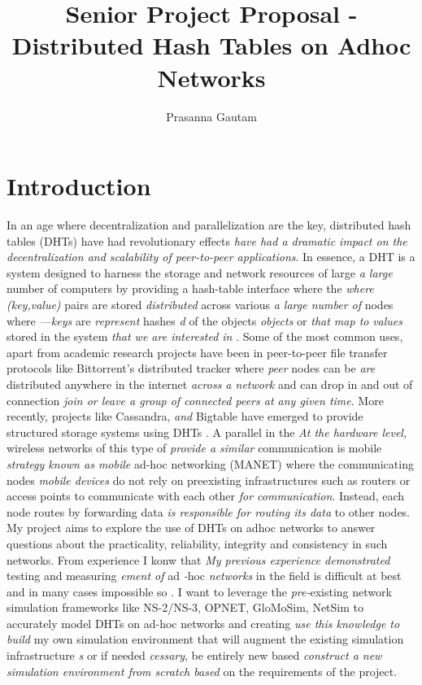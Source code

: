 \documentclass[a4paper,10pt]{article}
\newcommand{\cmt}[2]{{\color{red}#1} \emph{\color{green} #2}}
\begin{document}
\title{Senior Project Proposal - Distributed Hash Tables on Adhoc Networks}
\author{Prasanna Gautam}

\maketitle
{}
\section*{Introduction}
In an age where decentralization and parallelization are the key, distributed hash tables (DHTs) \cmt{have had revolutionary effects}{have had a dramatic impact on the decentralization and scalability of peer-to-peer applications}. In essence, a DHT is a system designed to harness the storage and network resources of \cmt{large}{a large} number of computers by providing a hash-table interface \cmt{where the}{where} \emph{(key,value)} pairs are \cmt{stored}{distributed} across \cmt{various}{a large number of} nodes\cmt{ where}{---}\emph{keys} \cmt{are}{represent} hashe\cmt{s}{d} \cmt{of the objects}{objects} \cmt{or}{that map to} \emph{values} \cmt{stored in the system}{that we are interested in} \cite{Naor07novelarchitectures}. Some of the most common uses, apart from academic research projects have been in peer-to-peer file transfer protocols like Bittorrent's distributed tracker where \cmt{}{peer} nodes \cmt{can be}{are} distributed \cmt{anywhere in the internet}{across a network} and can \cmt{drop in and out of connection}{join or leave a group of connected peers at any given time}. More recently, projects like Cassandra\cmt{,}{ and} Bigtable have emerged to provide structured storage systems using DHTs \cite{Chang06bigtable:a}\cite{Lakshman_cassandra-a}. \cmt{A parallel in the}{At the hardware level,} wireless networks \cmt{of this type of}{provide a similar} communication \cmt{is mobile}{strategy known as mobile} ad-hoc networking (MANET) where the communicating \cmt{nodes}{mobile devices} do not rely on preexisting infrastructure\cmt{s}{} such as routers or access points \cmt{to communicate with each other}{for communication}. Instead, each node \cmt{routes by forwarding data}{is responsible for routing its data} to other nodes. My project aims to explore the use of DHTs on adhoc networks to answer questions about the practicality, reliability, integrity and consistency in such networks. \cmt{From experience I konw that}{My previous experience demonstrated} testing and measur\cmt{ing}{ement of} ad\cmt{}{-}hoc \cmt{}{networks} in the field is difficult at best \cmt{and in many cases impossible}\cmt{ so }{.  }I want to leverage \cmt{the }{pre-}existing network simulation frameworks like NS-2/NS-3, OPNET, GloMoSim, NetSim to accurately model DHTs on ad-hoc networks and \cmt{creating}{use this knowledge to build} my own simulation environment that will augment \cmt{the}{} existing simulation infrastructure\cmt{}{s} or if ne\cmt{eded}{cessary}\cmt{, be entirely new based}{ construct a new simulation environment from scratch based} on the requirements of the project.
\end{document}
